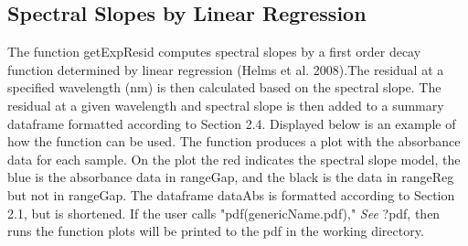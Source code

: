 \documentclass[a4paper,11pt]{article}\usepackage[]{graphicx}\usepackage[]{color}
\begin{document}
\subsection{Spectral Slopes by Linear Regression}
The function getExpResid computes spectral slopes by a first order decay function determined by linear regression (Helms et al. 2008).The residual at a specified wavelength (nm) is then calculated based on the spectral slope. The residual at a given wavelength and spectral slope is then added to a summary dataframe formatted according to Section 2.4. Displayed below is an example of how the function can be used. The function produces a plot with the absorbance data for each sample. On the plot the red indicates the spectral slope model, the blue is the absorbance data in rangeGap, and the black is the data in rangeReg but not in rangeGap. The dataframe dataAbs is formatted according to Section 2.1, but is shortened. If the user calls "pdf(genericName.pdf)," \emph{See }?pdf, then runs the function plots will be printed to the pdf in the working directory. 
\end{document}
